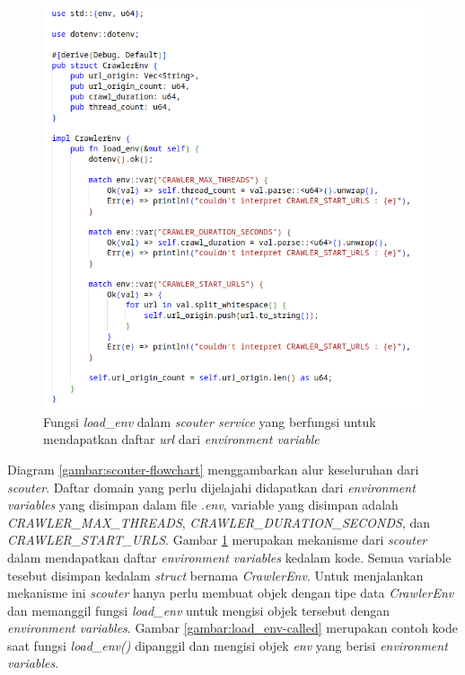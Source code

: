 \begin{figure}[H]
  \centering
  \includegraphics[keepaspectratio, width=13cm]{gambar/get_env_code.png}
  \caption{Fungsi \emph{load\_env} dalam \emph{scouter service} yang berfungsi untuk mendapatkan daftar \emph{url} dari \emph{environment variable}}
  \label{gambar:get_env_code}
\end{figure}

Diagram \ref{gambar:scouter-flowchart} menggambarkan alur keseluruhan dari \emph{scouter}. Daftar domain yang perlu dijelajahi didapatkan dari \emph{environment variables} yang disimpan dalam file \emph{.env}, variable yang disimpan adalah \emph{CRAWLER\_MAX\_THREADS}, \emph{CRAWLER\_DURATION\_SECONDS}, dan \emph{CRAWLER\_START\_URLS}. Gambar \ref{gambar:get_env_code} merupakan mekanisme dari \emph{scouter} dalam mendapatkan daftar \emph{environment variables} kedalam kode. Semua variable tesebut disimpan kedalam \emph{struct} bernama \emph{CrawlerEnv}. Untuk menjalankan mekanisme ini \emph{scouter} hanya perlu membuat objek dengan tipe data \emph{CrawlerEnv} dan memanggil fungsi \emph{load\_env} untuk mengisi objek tersebut dengan \emph{environment variables}. Gambar \ref{gambar:load_env-called} merupakan contoh kode saat fungsi \emph{load\_env()} dipanggil dan mengisi objek \emph{env} yang berisi \emph{environment variables}.

